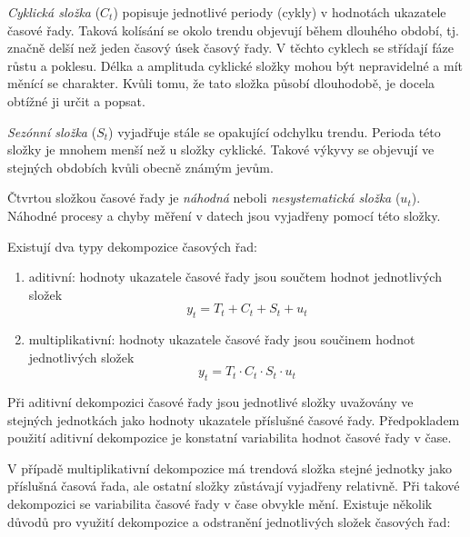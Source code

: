 \documentclass[a4paper,12pt,twoside]{scrreprt}
\begin{document}
\textit{Cyklická složka} ($C_t$) popisuje jednotlivé periody (cykly) v hodnotách ukazatele časové řady. Taková kolísání se okolo trendu objevují během dlouhého období, tj. značně delší než jeden časový úsek časový řady. V těchto cyklech se střídají fáze růstu a poklesu. Délka a amplituda cyklické složky mohou být nepravidelné a mít měnící se charakter. Kvůli tomu, že tato složka působí dlouhodobě, je docela obtížné ji určit a popsat. 

\textit{Sezónní složka} ($S_t$) vyjadřuje stále se opakující odchylku trendu. Perioda této složky je mnohem menší než u složky cyklické. Takové výkyvy se objevují ve stejných obdobích kvůli obecně známým jevům.

Čtvrtou složkou časové řady je \textit{náhodná} neboli \textit{nesystematická složka} ($u_t$). \\ Náhodné procesy a chyby měření v datech jsou vyjadřeny pomocí této složky. 	

Existují dva typy dekompozice časových řad:

\begin{enumerate}

\item aditivní: hodnoty ukazatele časové řady jsou součtem hodnot jednotlivých složek
\begin{equation}
y_t = T_t + C_t + S_t + u_t
\end{equation}

\item multiplikativní: hodnoty ukazatele časové řady jsou součinem hodnot jednotlivých složek 
\begin{equation}
y_t = T_t \cdot C_t \cdot S_t \cdot u_t
\end{equation}

\end{enumerate}

Při aditivní dekompozici časové řady jsou jednotlivé složky uvažovány ve \\ stejných jednotkách jako hodnoty ukazatele příslušné časové řady. Předpokladem použití aditivní dekompozice je konstatní variabilita hodnot časové řady v čase.

V případě multiplikativní dekompozice má trendová složka stejné jednotky jako příslušná časová řada, ale ostatní složky zůstávají vyjadřeny relativně. Při takové dekompozici se variabilita časové řady v čase obvykle mění. Existuje několik důvodů pro využití dekompozice a odstranění jednotlivých složek časových řad:
\end{document}

